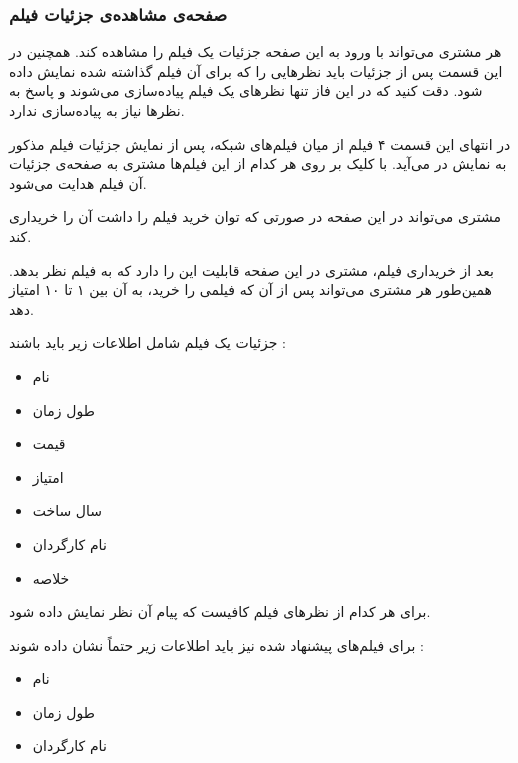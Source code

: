 \documentclass{utap}
\begin{document}
	
		\subsubsection{صفحه‌ی مشاهده‌ی جزئیات فیلم }
		
		هر مشتری می‌تواند با ورود به این صفحه جزئیات یک فیلم را مشاهده کند. همچنین در این قسمت پس از جزئیات باید نظرهایی را که برای آن فیلم گذاشته شده نمایش داده شود. دقت کنید که در این فاز تنها نظر‌های یک فیلم پیاده‌سازی می‌شوند و پاسخ به نظر‌ها نیاز به پیاده‌سازی ندارد.
		
		در  انتهای این قسمت ۴ فیلم از میان فیلم‌های شبکه، پس از نمایش جزئیات فیلم مذکور به نمایش در می‌آید. 
	با کلیک بر روی هر کدام از این فیلم‌ها مشتری به صفحه‌ی جزئیات آن فیلم هدایت می‌شود. 
		
		مشتری می‌تواند در این صفحه در صورتی که توان خرید فیلم را داشت آن‌ را خریداری کند. 
		
		بعد از خریداری فیلم، مشتری در این صفحه قابلیت این را دارد که به فیلم نظر بدهد. همین‌طور هر مشتری می‌تواند پس از آن‌ که فیلمی را خرید، به آن بین ۱ تا ۱۰ امتیاز دهد. 
		
		جزئیات یک فیلم شامل اطلاعات زیر باید باشند : 
		
		\begin{multicols}{3}
		\begin{itemize}
			\item نام 
			\item طول زمان  
			\item قیمت 
			\item امتیاز 
			\item سال ساخت
			\item نام کارگردان
			\item خلاصه‌
		\end{itemize}
		\end{multicols}
	
		برای هر کدام از نظر‌های فیلم کافیست که پیام آن نظر‌ نمایش داده شود.
		
		برای فیلم‌های پیشنهاد شده نیز باید اطلاعات زیر حتماً نشان داده شوند :
		
		\begin{multicols}{3}
			\begin{itemize}
				\item نام
				\item طول زمان
				\item نام کارگردان
			\end{itemize}
		\end{multicols}
	
	
	
\end{document}
